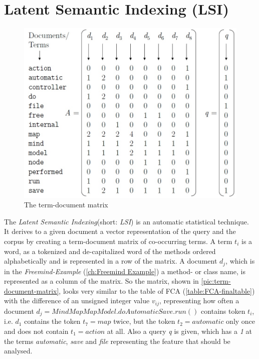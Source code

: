 \section{Latent Semantic Indexing (LSI)}
\label{sec:LSI}
\begin{figure}
	\vspace{-2em}
  \centering
  \includegraphics[width=\linewidth]{src/pic/term_document_matrix}
  \caption{The term-document matrix}
  \label{pic:term-document-matrix}
\end{figure}
The \emph{Latent Semantic Indexing}(short: \emph{LSI}) is an automatic statistical technique. It derives to a given document a vector representation of the query and the corpus by creating a term-document matrix of co-occurring terms. A term $t_i$ is a word, as a tokenized and de-capitalized word of the methods ordered alphabetically and is represented in a row of the matrix. A document $d_j$, which is in the \textit{Freemind-Example} (\autoref{ch:Freemind Example}) a method- or class name, is represented as a column of the matrix. So the matrix, shown in \autoref{pic:term-document-matrix}, looks very similar to the table of FCA (\autoref{table:FCA-finaltable}) with the difference of an unsigned integer value $v_{ij}$, representing how often a document $d_j=MindMapMapModel.doAutomaticSave.run()$ contains token $t_i$, i.e. $d_1$ contains the token $t_7=map$ twice, but the token $t_2=automatic$ only once and does not contain $t_1=action$ at all. Also a query \emph{q} is given, which has a \emph{1} at the terms \emph{automatic}, \emph{save} and \emph{file} representing the feature that should be analysed. 
